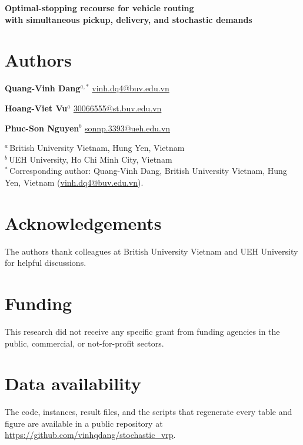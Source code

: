 \documentclass[11pt]{article}
\begin{document}
\begin{center}
{\LARGE\bfseries Optimal-stopping recourse for vehicle routing\\[2pt]
with simultaneous pickup, delivery, and stochastic demands}
\end{center}

\vspace{18pt}
\section*{Authors}

\textbf{Quang-Vinh Dang}$^{a,*}$\quad
\href{mailto:vinh.dq4@buv.edu.vn}{vinh.dq4@buv.edu.vn}

\textbf{Hoang-Viet Vu}$^{a}$\quad
\href{mailto:30066555@st.buv.edu.vn}{30066555@st.buv.edu.vn}

\textbf{Phuc-Son Nguyen}$^{b}$\quad
\href{mailto:sonnp.3393@ueh.edu.vn}{sonnp.3393@ueh.edu.vn}

\vspace{8pt}
$^{a}$\,British University Vietnam, Hung Yen, Vietnam\\
$^{b}$\,UEH University, Ho Chi Minh City, Vietnam\\[6pt]
$^{*}$\,Corresponding author: Quang-Vinh Dang,
British University Vietnam, Hung Yen, Vietnam
(\href{mailto:vinh.dq4@buv.edu.vn}{vinh.dq4@buv.edu.vn}).

\section*{Acknowledgements}
The authors thank colleagues at British University Vietnam and UEH
University for helpful discussions.

\section*{Funding}
This research did not receive any specific grant from funding agencies
in the public, commercial, or not-for-profit sectors.

\section*{Data availability}
The code, instances, result files, and the scripts that regenerate
every table and figure are available in a public repository at
\url{https://github.com/vinhqdang/stochastic_vrp}.
\end{document}
